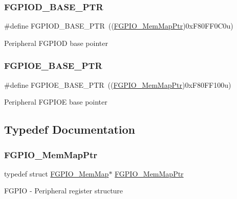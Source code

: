 \subsubsection{\texorpdfstring{F\+G\+P\+I\+O\+D\+\_\+\+B\+A\+S\+E\+\_\+\+P\+TR}{FGPIOD\_BASE\_PTR}}
{\footnotesize\ttfamily \#define F\+G\+P\+I\+O\+D\+\_\+\+B\+A\+S\+E\+\_\+\+P\+TR~((\hyperlink{group___f_g_p_i_o___peripheral_gaeed3beeb5e5c99ae5b0e404b21466e55}{F\+G\+P\+I\+O\+\_\+\+Mem\+Map\+Ptr})0x\+F80\+F\+F0\+C0u)}

Peripheral F\+G\+P\+I\+OD base pointer \mbox{\label{group___f_g_p_i_o___peripheral_ga07d1ba914f3ded63431edec77d4544ee}} 
\subsubsection{\texorpdfstring{F\+G\+P\+I\+O\+E\+\_\+\+B\+A\+S\+E\+\_\+\+P\+TR}{FGPIOE\_BASE\_PTR}}
{\footnotesize\ttfamily \#define F\+G\+P\+I\+O\+E\+\_\+\+B\+A\+S\+E\+\_\+\+P\+TR~((\hyperlink{group___f_g_p_i_o___peripheral_gaeed3beeb5e5c99ae5b0e404b21466e55}{F\+G\+P\+I\+O\+\_\+\+Mem\+Map\+Ptr})0x\+F80\+F\+F100u)}

Peripheral F\+G\+P\+I\+OE base pointer 

\subsection{Typedef Documentation}
\mbox{\label{group___f_g_p_i_o___peripheral_gaeed3beeb5e5c99ae5b0e404b21466e55}} 
\subsubsection{\texorpdfstring{F\+G\+P\+I\+O\+\_\+\+Mem\+Map\+Ptr}{FGPIO\_MemMapPtr}}
{\footnotesize\ttfamily typedef struct \hyperlink{struct_f_g_p_i_o___mem_map}{F\+G\+P\+I\+O\+\_\+\+Mem\+Map}$\ast$ \hyperlink{group___f_g_p_i_o___peripheral_gaeed3beeb5e5c99ae5b0e404b21466e55}{F\+G\+P\+I\+O\+\_\+\+Mem\+Map\+Ptr}}

F\+G\+P\+IO -\/ Peripheral register structure 